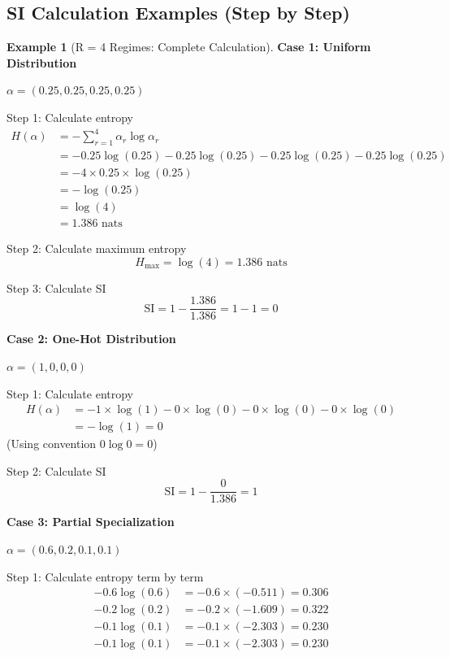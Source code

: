 \documentclass[11pt,a4paper]{article}
\theoremstyle{definition}
\newtheorem{example}{Example}[section]
\theoremstyle{plain}
\newcommand{\SI}{\text{SI}}
\begin{document}
\subsection{SI Calculation Examples (Step by Step)}

\begin{example}[R = 4 Regimes: Complete Calculation]
\textbf{Case 1: Uniform Distribution}

$\alpha = (0.25, 0.25, 0.25, 0.25)$

Step 1: Calculate entropy
\begin{align}
H(\alpha) &= -\sum_{r=1}^{4} \alpha_r \log \alpha_r \\
&= -0.25\log(0.25) - 0.25\log(0.25) - 0.25\log(0.25) - 0.25\log(0.25) \\
&= -4 \times 0.25 \times \log(0.25) \\
&= -\log(0.25) \\
&= \log(4) \\
&= 1.386 \text{ nats}
\end{align}

Step 2: Calculate maximum entropy
\begin{equation}
H_{\max} = \log(4) = 1.386 \text{ nats}
\end{equation}

Step 3: Calculate SI
\begin{equation}
\SI = 1 - \frac{1.386}{1.386} = 1 - 1 = 0
\end{equation}

\textbf{Case 2: One-Hot Distribution}

$\alpha = (1, 0, 0, 0)$

Step 1: Calculate entropy
\begin{align}
H(\alpha) &= -1 \times \log(1) - 0 \times \log(0) - 0 \times \log(0) - 0 \times \log(0) \\
&= -\log(1) = 0
\end{align}
(Using convention $0 \log 0 = 0$)

Step 2: Calculate SI
\begin{equation}
\SI = 1 - \frac{0}{1.386} = 1
\end{equation}

\textbf{Case 3: Partial Specialization}

$\alpha = (0.6, 0.2, 0.1, 0.1)$

Step 1: Calculate entropy term by term
\begin{align}
-0.6 \log(0.6) &= -0.6 \times (-0.511) = 0.306 \\
-0.2 \log(0.2) &= -0.2 \times (-1.609) = 0.322 \\
-0.1 \log(0.1) &= -0.1 \times (-2.303) = 0.230 \\
-0.1 \log(0.1) &= -0.1 \times (-2.303) = 0.230
\end{align}


\end{example}
\end{document}
